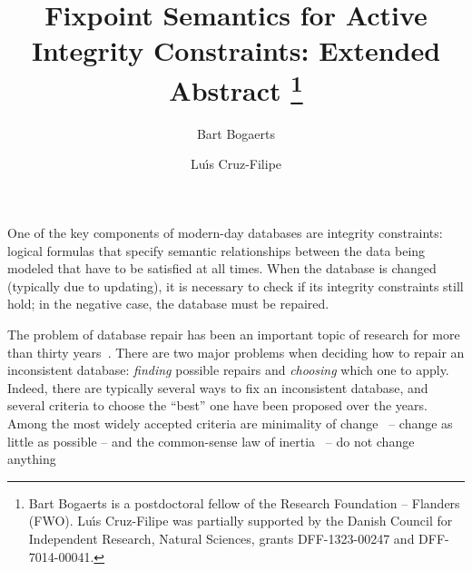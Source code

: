 \documentclass[runningheads]{llncs}
\begin{document}
%
\title{Fixpoint Semantics for Active Integrity Constraints: Extended Abstract \thanks{Bart Bogaerts is a postdoctoral fellow of the Research Foundation -- Flanders (FWO).
Lu\'\i s Cruz-Filipe was partially supported by the Danish Council for Independent Research, Natural Sciences, grants DFF-1323-00247 and DFF-7014-00041.}}
%
%
\author{Bart Bogaerts \and
Lu\'\i s Cruz-Filipe }
%
%
%
\maketitle              %
% 
%
%
%


One of the key components of modern-day databases are integrity constraints: logical formulas that specify semantic relationships between the data being modeled that have to be satisfied at all times.
When the database is changed (typically due to updating), it is necessary to check if its integrity constraints still hold; in the negative case, the database must be repaired.

The problem of database repair has been an important topic of research for more than thirty years~\cite{icdt/Abiteboul88}.
There are two major problems when deciding how to repair an inconsistent database: \emph{finding} possible repairs and \emph{choosing} which one to apply.
Indeed, there are typically several ways to fix an inconsistent database, and several criteria to choose the ``best'' one have been proposed over the years.
Among the most widely accepted criteria are minimality of change~\cite{Winslett90,ai/EiterG92} -- change as little as possible -- and the common-sense law of inertia~\cite[discussed in, e.g.,][]{jlp/PrzymusinskiT97} -- do not change anything 
\end{document}

